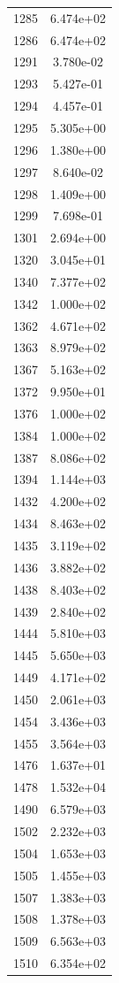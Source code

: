 \documentclass[12pt]{article}
\begin{document}
\begin{longtable}{@{}cc@{}}
1285 & 6.474e+02 \\
1286 & 6.474e+02 \\
1291 & 3.780e-02 \\
1293 & 5.427e-01 \\
1294 & 4.457e-01 \\
1295 & 5.305e+00 \\
1296 & 1.380e+00 \\
1297 & 8.640e-02 \\
1298 & 1.409e+00 \\
1299 & 7.698e-01 \\
1301 & 2.694e+00 \\
1320 & 3.045e+01 \\
1340 & 7.377e+02 \\
1342 & 1.000e+02 \\
1362 & 4.671e+02 \\
1363 & 8.979e+02 \\
1367 & 5.163e+02 \\
1372 & 9.950e+01 \\
1376 & 1.000e+02 \\
1384 & 1.000e+02 \\
1387 & 8.086e+02 \\
1394 & 1.144e+03 \\
1432 & 4.200e+02 \\
1434 & 8.463e+02 \\
1435 & 3.119e+02 \\
1436 & 3.882e+02 \\
1438 & 8.403e+02 \\
1439 & 2.840e+02 \\
1444 & 5.810e+03 \\
1445 & 5.650e+03 \\
1449 & 4.171e+02 \\
1450 & 2.061e+03 \\
1454 & 3.436e+03 \\
1455 & 3.564e+03 \\
1476 & 1.637e+01 \\
1478 & 1.532e+04 \\
1490 & 6.579e+03 \\
1502 & 2.232e+03 \\
1504 & 1.653e+03 \\
1505 & 1.455e+03 \\
1507 & 1.383e+03 \\
1508 & 1.378e+03 \\
1509 & 6.563e+03 \\
1510 & 6.354e+02 \\

\end{longtable}
\end{document}
